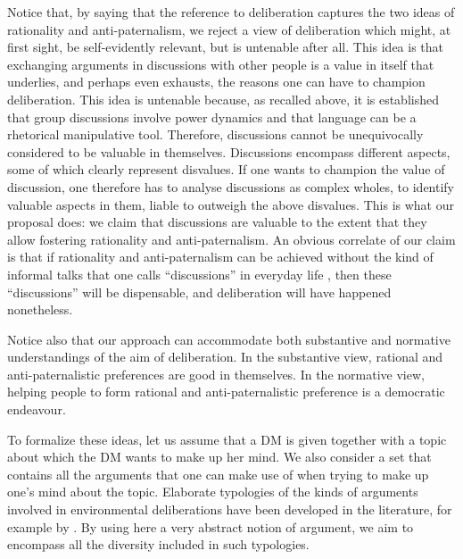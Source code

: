 \documentclass[version=3.21, pagesize, twoside=off, bibliography=totoc, DIV=calc, fontsize=12pt, a4paper, french, english]{scrartcl}
\begin{document}
Notice that, by saying that the reference to deliberation captures the two ideas of rationality and anti-paternalism, we reject a view of deliberation which might, at first sight, be self-evidently relevant, but is untenable after all. This idea is that exchanging arguments in discussions with other people is a value in itself that underlies, and perhaps even exhausts, the reasons one can have to champion deliberation. %
This idea is untenable because, as recalled above, it is established that group discussions involve power dynamics and that language can be a rhetorical manipulative tool. Therefore, discussions cannot be unequivocally considered to be valuable in themselves. Discussions encompass different aspects, some of which clearly represent disvalues. If one wants to champion the value of discussion, one therefore has to analyse discussions as complex wholes, to identify valuable aspects in them, liable to outweigh the above disvalues. This is what our proposal does: we claim that discussions are valuable to the extent that they allow fostering rationality and anti-paternalism. An obvious correlate of our claim is that if rationality and anti-paternalism can be achieved without the kind of informal talks that one calls “discussions” in everyday life%
, then these “discussions” will be dispensable, and deliberation will have happened nonetheless.

Notice also that our approach can accommodate both substantive and normative understandings of the aim of deliberation. In the substantive view, rational and anti-paternalistic preferences are good in themselves. In the normative view, helping people to form rational and anti-paternalistic preference is a democratic endeavour.

To formalize these ideas, let us assume that a \ac{DM} is given together with a topic about which the \ac{DM} wants to make up her mind.
We also consider a set that contains all the arguments that one can make use of when trying to make up one’s mind about the topic.
Elaborate typologies of the kinds of arguments involved in environmental deliberations have been developed in the literature, for example by \citet{chateauraynaud_contrainte_2007}. 
By using here a very abstract notion of argument, we aim to encompass all the diversity included in such typologies. 
\end{document}
